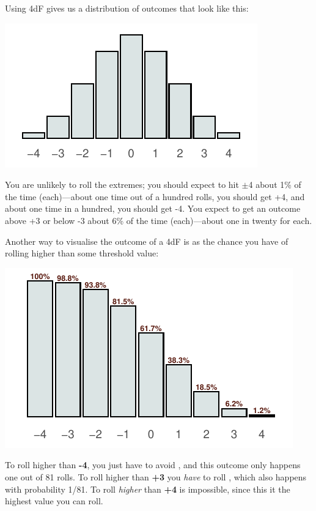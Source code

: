 Using 4dF gives us a distribution of outcomes that look like this:
\begin{center}
\includegraphics{stats/4dF.pdf}
\end{center}

You are unlikely to roll the extremes; you should expect to hit $\pm$4 about 1\% of the time (each)---about one time out of a hundred rolls, you should get +4, and about one time in a hundred, you should get -4. You expect to get an outcome above +3 or below -3 about 6\% of the time (each)---about one in twenty for each.

Another way to visualise the outcome of a 4dF is as the chance you have of rolling higher than some threshold value:

\begin{center}
\includegraphics{stats/4dF-success.pdf}
\end{center}

To roll higher than \textbf{-4}, you just have to avoid \FudgeRes{-}{-}{-}{-}, and this outcome only happens one out of 81 rolls. To roll higher than \textbf{+3} you \emph{have} to roll \FudgeRes{+}{+}{+}{+}, which also happens with probability 1/81. To roll \emph{higher} than \textbf{+4} is impossible, since this it the highest value you can roll.

